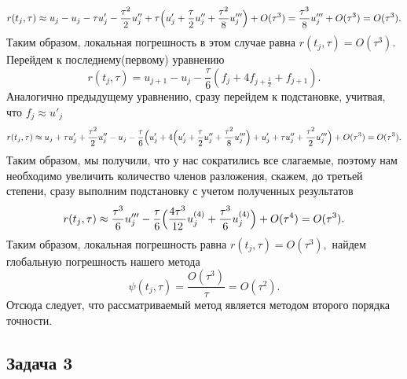 \documentclass[11pt]{article}
\begin{document}
    \[r(t_j, \tau) \approx u_j - u_j - \tau u'_j - \frac{\tau^2}{2}u''_j+\tau \Bigl( u'_j+\frac{\tau}{2}u''_j+\frac{\tau^2}{8}u'''_j \Bigr) + O(\tau^3)=\frac{\tau^3}{8}u'''_j + O(\tau^3) = O(\tau^3).\]
Таким образом, локальная погрешность в этом случае равна
\(r(t_j, \tau) = O(\tau^3)\). Перейдем к последнему(первому) уравнению
\[r(t_j, \tau) = u_{j+1}-u_j-\frac{\tau}{6}(f_j+4f_{j+\frac{1}{2}}+f_{j+1}).\]
Аналогично предыдущему уравнению, сразу перейдем к подстановке, учитвая,
что \(f_j \approx u'_j\)
\[r(t_j, \tau) \approx u_j+\tau u'_j+\frac{\tau^2}{2}u''_j - u_j - \frac{\tau}{6}\Bigl(u'_j + 4 \Bigl(u'_j+\frac{\tau}{2}u''_j+\frac{\tau^2}{8}u'''_j\Bigr) + u'_j+\tau u''_j+\frac{\tau^2}{2}u'''_j\Bigr) + O(\tau^3)=O(\tau^3).\]
Таким образом, мы получили, что у нас сократились все слагаемые, поэтому
нам необходимо увеличить количество членов разложения, скажем, до
третьей степени, сразу выполним подстановку с учетом полученных
результатов
\[r(t_j, \tau) \approx \frac{\tau^3}{6}u'''_j-\frac{\tau}{6}\Bigl( \frac{4\tau^3}{12}u^{(4)}_j+\frac{\tau^3}{6}u^{(4)}_j\Bigr) + O(\tau^4) = O(\tau^3).\]
Таким образом, локальная погрешность равна \(r(t_j, \tau)=O(\tau^3),\)
найдем глобальную погрешность нашего метода
\[\psi(t_j, \tau) = \dfrac{O(\tau^3)}{\tau} = O(\tau^2).\] Отсюда
следует, что рассматриваемый метод является методом второго порядка
точности.

    \subsection*{Задача 3}\label{ux437ux430ux434ux430ux447ux430-3}
\end{document}
